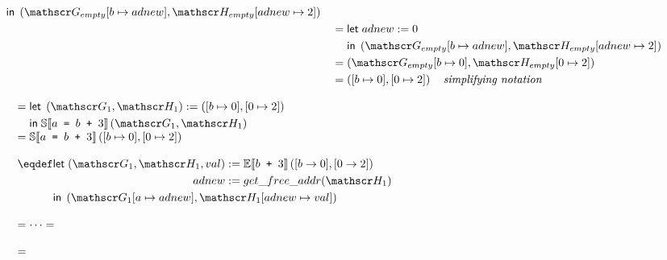 \begin{figure}
\[\begin{array}{l}
\begin{aligned}[t]
\begin{aligned}[t]
          &\inm \left(\Glo_{empty}[b \mapsto adnew], \Hea_{empty}[adnew \mapsto 2]\right) \\
        \end{aligned}\\
        &\quad=
        \begin{aligned}[t]
          &\letm adnew := 0 \\
          &\inm \left(\Glo_{empty}[b \mapsto adnew], \Hea_{empty}[adnew \mapsto 2]\right) \\
        \end{aligned}\\
        &\quad= \left(\Glo_{empty}[b \mapsto 0], \Hea_{empty}[0 \mapsto 2]\right) \\
        &\quad= \left([b \mapsto 0], [0 \mapsto 2]\right) \quad \textit{simplifying notation} \\
      \end{aligned}\\
    \\
    \quad=
      \begin{aligned}[t]
        &\letm \left(\Glo_1, \Hea_1\right) := \left([b \mapsto 0], [0 \mapsto 2]\right) \\
        &\inm \Ctx{S}{a \texttt{ = } b \texttt{ + } 3}\left(\Glo_1, \Hea_1\right) \\
      \end{aligned}\\
    \quad=\Ctx{S}{a \texttt{ = } b \texttt{ + } 3}\left([b \mapsto 0], [0 \mapsto 2]\right) \\
    \\
    \quad\eqdef
    \begin{aligned}[t]
      &\letm
        \begin{aligned}[t]
          \left(\Glo_1, \Hea_1, val\right) &:= \Ctx{E}{b \texttt{ + } 3}\left([b \to 0], [0 \to 2]\right) \\
          adnew &:= get\_free\_addr(\Hea_1) \\
        \end{aligned}\\
      &\inm \left(\Glo_1[a \mapsto adnew], \Hea_1[adnew \mapsto val]\right) \\
    \end{aligned}\\
    \\
    \quad= \cdots = \\
    \\
    \quad=
    \begin{aligned}[t]

\end{aligned}
\end{array}\]
\end{figure}
